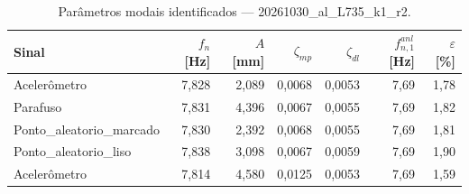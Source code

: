 \begin{table}[htbp]
  \centering
  \caption{Parâmetros modais identificados — 20261030\_al\_L735\_k1\_r2.}
  \label{tab:modal_20261030_al_L735_k1_r2}
  \begin{tabular}{lrrrrrr}
    \toprule
    Sinal & $f_n$ [Hz] & $A$ [mm] & $\zeta_{mp}$ & $\zeta_{dl}$ & $f_{n,1}^{anl}$ [Hz] & $\varepsilon$ [\%] \\
    \midrule
    Acelerômetro & 7{,}828 & 2{,}089 & 0{,}0068 & 0{,}0053 & 7{,}69 & 1{,}78 \\
    Parafuso & 7{,}831 & 4{,}396 & 0{,}0067 & 0{,}0055 & 7{,}69 & 1{,}82 \\
    Ponto\_aleatorio\_marcado & 7{,}830 & 2{,}392 & 0{,}0068 & 0{,}0055 & 7{,}69 & 1{,}81 \\
    Ponto\_aleatorio\_liso & 7{,}838 & 3{,}098 & 0{,}0067 & 0{,}0059 & 7{,}69 & 1{,}90 \\
    Acelerômetro & 7{,}814 & 4{,}580 & 0{,}0125 & 0{,}0053 & 7{,}69 & 1{,}59 \\
    \bottomrule
  \end{tabular}
\end{table}
